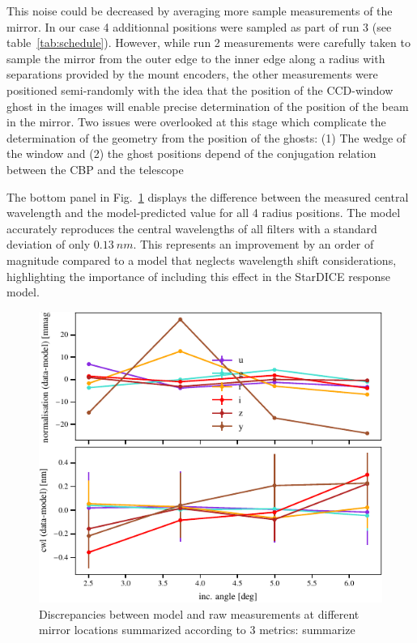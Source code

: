 This noise could be decreased by averaging more sample measurements of
the mirror. In our case 4 additionnal positions were sampled as part
of run 3 (see table~\ref{tab:schedule}). However, while run 2
measurements were carefully taken to sample the mirror from the outer
edge to the inner edge along a radius with separations provided by the
mount encoders, the other measurements were positioned semi-randomly
with the idea that the position of the CCD-window ghost in the images
will enable precise determination of the position of the beam in the
mirror. Two issues were overlooked at this stage which complicate the
determination of the geometry from the position of the ghosts: (1) The
wedge of the window and (2) the ghost positions depend of the
conjugation relation between the CBP and the telescope

The bottom panel in Fig.~\ref{fig:metrics} displays the difference
between the measured central wavelength and the model-predicted value
for all 4 radius positions. The model accurately reproduces the
central wavelengths of all filters with a standard deviation of only
$\SI{0.13}{nm}$. This represents an improvement by an order of
magnitude compared to a model that neglects wavelength shift
considerations, highlighting the importance of including this effect
in the StarDICE response model.

\begin{figure}
  \centering
  \includegraphics[width=1\linewidth]{fig/metrics.pdf}
  \caption{Discrepancies between model and raw measurements at different mirror locations summarized according to 3 metrics: summarize}
  \label{fig:metrics}
\end{figure}

